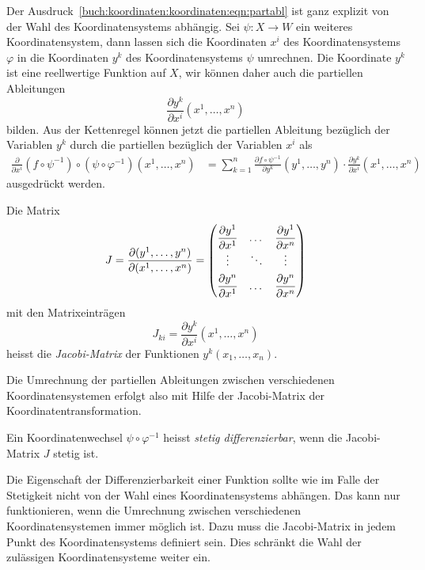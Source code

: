 Der Ausdruck~\eqref{buch:koordinaten:koordinaten:eqn:partabl} ist ganz
explizit von der Wahl des Koordinatensystems abhängig.
Sei $\psi\colon X\to W$ ein weiteres Koordinatensystem, dann lassen sich
die Koordinaten $x^i$ des Koordinatensystems $\varphi$ in die 
Koordinaten $y^k$ des Koordinatensystems $\psi$ umrechnen.
Die Koordinate $y^k$ ist eine reellwertige Funktion auf $X$, wir
können daher auch die partiellen Ableitungen
\[
\frac{\partial y^k}{\partial x^i}(x^1,\dots,x^n)
\]
bilden.
Aus der Kettenregel können jetzt die partiellen Ableitung bezüglich
der Variablen $y^k$ durch die partiellen bezüglich der Variablen $x^i$
als
\begin{align*}
\frac{\partial}{\partial x^i}
(f\circ\psi^{-1})\circ (\psi\circ\varphi^{-1})(x^1,\dots,x^n)
&=
\sum_{k=1}^n
\frac{\partial f\circ\psi^{-1}}{\partial y^k}(y^1,\dots,y^n)
\cdot
\frac{\partial y^k}{\partial x^i}(x^1,\dots,x^n)
\end{align*}
ausgedrückt werden.

\begin{definition}
Die Matrix
\[
J
=
\frac{\partial(y^1,\dots,y^n)}{\partial(x^1,\dots,x^n)}
=
\bgroup
\renewcommand\arraystretch{1.8}
\begin{pmatrix}
\displaystyle\frac{\partial y^1}{\partial x^1}&\dots&\displaystyle\frac{\partial y^1}{\partial x^n}\\
\vdots&\ddots&\vdots\\
\displaystyle\frac{\partial y^n}{\partial x^1}&\dots&\displaystyle\frac{\partial y^n}{\partial x^n}\\
\end{pmatrix}
\egroup
\]
mit den Matrixeinträgen
\[
J_{ki}
=
\frac{\partial y^k}{\partial x^i}(x^1,\dots,x^n)
\]
heisst die {\em Jacobi-Matrix} der Funktionen $y^k(x_1,\dots,x_n)$.
%
\end{definition}

Die Umrechnung der partiellen Ableitungen zwischen verschiedenen
Koordinatensystemen erfolgt also mit Hilfe der Jacobi-Matrix der
Koordinatentransformation.

\begin{definition}
Ein Koordinatenwechsel $\psi\circ\varphi^{-1}$ heisst
{\em stetig differenzierbar}, wenn die Jacobi-Matrix $J$
stetig ist.
\end{definition}

Die Eigenschaft der Differenzierbarkeit einer Funktion sollte wie
im Falle der Stetigkeit nicht von der Wahl eines Koordinatensystems
abhängen.
Das kann nur funktionieren, wenn die Umrechnung zwischen verschiedenen
Koordinatensystemen immer möglich ist.
Dazu muss die Jacobi-Matrix in jedem Punkt des Koordinatensystems
definiert sein.
Dies schränkt die Wahl der zulässigen Koordinatensysteme weiter ein.


